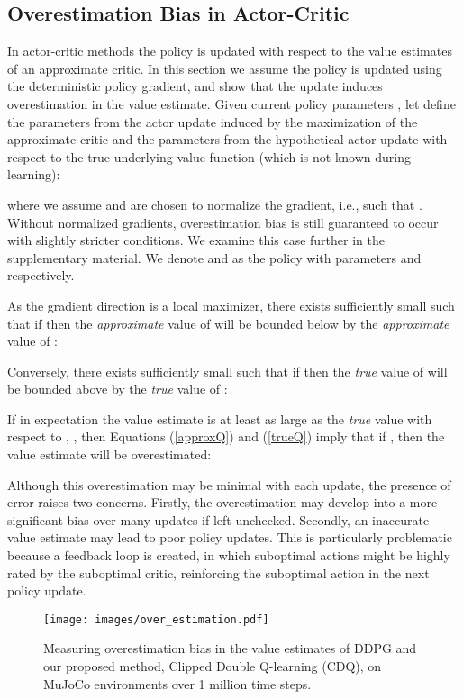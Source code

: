 \documentclass{article}
\begin{document}
\subsection{Overestimation Bias in Actor-Critic} \label{sec:overac}


In actor-critic methods the policy is updated with respect to the value estimates of an approximate critic. In this section we assume the policy is updated using the deterministic policy gradient, and show that the update induces overestimation in the value estimate. 
Given current policy parameters , let  define the parameters from the actor update induced by the maximization of the approximate critic  and  the parameters from the hypothetical actor update with respect to the true underlying value function  (which is not known during learning): 
 
where we assume  and  are chosen to normalize the gradient, i.e., such that . Without normalized gradients, overestimation bias is still guaranteed to occur with slightly stricter conditions. We examine this case further in the supplementary material. We denote  and  as the policy with parameters  and  respectively. 

As the gradient direction is a local maximizer, there exists  sufficiently small such that if  then the \emph{approximate} value of  will be bounded below by the \emph{approximate} value of :

Conversely, there exists  sufficiently small such that if  then the \emph{true} value of  will be bounded above by the \emph{true} value of :

If in expectation the value estimate is at least as large as the \textit{true} value with respect to , 
, then Equations (\ref{approxQ}) and (\ref{trueQ}) imply that if , then the value estimate will be overestimated:


Although this overestimation may be minimal with each update, the presence of error raises two concerns. Firstly, the overestimation may develop into a more significant bias over many updates if left unchecked. Secondly, an inaccurate value estimate may lead to poor policy updates. This is particularly problematic because a feedback loop is created, in which suboptimal actions might be highly rated by the suboptimal critic, reinforcing the suboptimal action in the next policy update.

\begin{figure} 
\centering
\captionsetup[subfloat]{captionskip=-8pt}
\texttt{[image: images/over\_estimation.pdf]}
\subfloat[Hopper-v1]{\hspace{0.56\linewidth}}
\subfloat[Walker2d-v1]{\hspace{0.44\linewidth}}
\caption{Measuring overestimation bias in the value estimates of DDPG and our proposed method, Clipped Double Q-learning (CDQ), on MuJoCo environments over 1 million time steps.} \label{fig:overestimation}
\end{figure}
\end{document}
